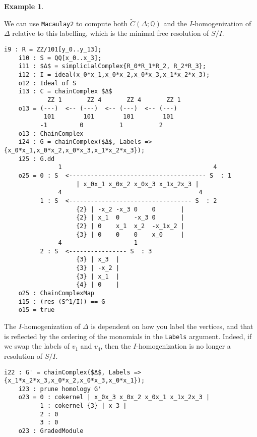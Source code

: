 \documentclass[12pt,leqno]{amsart}
\theoremstyle{definition}
\newtheorem{example}[lemma]{Example}
\begin{document}
\begin{example}
\begin{figure}[h]
\end{figure}
% 
We can use \texttt{Macaulay2} to compute both $\widetilde C(\Delta; \mathbb Q)$ and the $I$-homogenization of $\Delta$ relative to this labelling, which is the minimal free resolution of $S/I$. 
%
\begin{lstlisting}[basicstyle={\ttfamily \scriptsize}, xleftmargin=-23pt]
    i9 : R = ZZ/101[y_0..y_13];
    i10 : S = QQ[x_0..x_3];
    i11 : $Δ$ = simplicialComplex{R_0*R_1*R_2, R_2*R_3};
    i12 : I = ideal(x_0*x_1,x_0*x_2,x_0*x_3,x_1*x_2*x_3);
    o12 : Ideal of S
    i13 : C = chainComplex $Δ$
            ZZ 1       ZZ 4       ZZ 4       ZZ 1
    o13 = (---)  <-- (---)  <-- (---)  <-- (---)
           101        101        101        101
          -1         0          1          2
    o13 : ChainComplex
    i24 : G = chainComplex($Δ$, Labels => {x_0*x_1,x_0*x_2,x_0*x_3,x_1*x_2*x_3});
    i25 : G.dd
               1                                          4
    o25 = 0 : S  <-------------------------------------- S  : 1
                    | x_0x_1 x_0x_2 x_0x_3 x_1x_2x_3 |
               4                                      4
          1 : S  <---------------------------------- S  : 2
                    {2} | -x_2 -x_3 0    0       |
                    {2} | x_1  0    -x_3 0       |
                    {2} | 0    x_1  x_2  -x_1x_2 |
                    {3} | 0    0    0    x_0     |
               4                    1
          2 : S  <---------------- S  : 3
                    {3} | x_3  |
                    {3} | -x_2 |
                    {3} | x_1  |
                    {4} | 0    |
    o25 : ChainComplexMap
    i15 : (res (S^1/I)) == G
    o15 = true
\end{lstlisting}
%
The $I$-homogenization of $\Delta$ is dependent on how you label the vertices, and that is reflected by the ordering of the monomials in the \texttt{Labels} argument. Indeed, if we swap the labels of $v_1$ and $v_4$, then the $I$-homogenization is no longer a resolution of $S/I$.
%
\begin{lstlisting}[basicstyle={\ttfamily \scriptsize}, xleftmargin=-23pt]
    i22 : G' = chainComplex($Δ$, Labels => {x_1*x_2*x_3,x_0*x_2,x_0*x_3,x_0*x_1});
    i23 : prune homology G'
    o23 = 0 : cokernel | x_0x_3 x_0x_2 x_0x_1 x_1x_2x_3 |
          1 : cokernel {3} | x_3 |                       
          2 : 0                                          
          3 : 0                                          
    o23 : GradedModule
\end{lstlisting}
%
\end{example}
\end{document}
